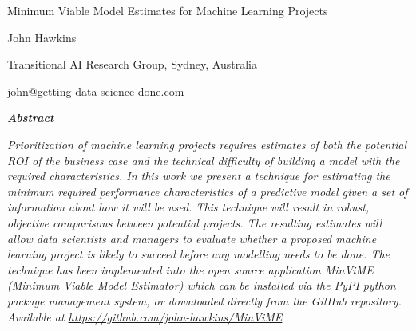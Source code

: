 \documentclass[11pt,a4paper]{article}
\begin{document}

\thispagestyle{firstPageStyle}

{ \vspace*{-0.05cm} \fontsize{21pt}{2em}\selectfont
  \centering Minimum Viable Model Estimates for Machine Learning Projects \par \vspace*{24pt minus \parskip} }
%
%
{ \centering  \fontsize{13pt}{1em}\selectfont John Hawkins \par\vspace*{12pt minus \parskip}}
%
{ \centering  \fontsize{13pt}{1em}\selectfont Transitional AI Research Group, Sydney, Australia\par \vspace*{18pt minus \parskip}}
{ \centering  \fontsize{10pt}{1em}\selectfont john@getting-data-science-done.com \par\vspace*{18pt minus \parskip} }

{ \fontsize{14pt}{1em}\selectfont \textbf{\textit{Abstract}} } \par \vspace*{6pt minus \parskip}

{  \fontsize{10pt}{1em}\selectfont
\textit{
Prioritization of machine learning projects requires estimates of both the potential ROI
of the business case and the technical difficulty of building a model with the required
characteristics.
In this work we present a technique for estimating the minimum required
performance characteristics of a predictive model given a set of information about
how it will be used. This technique will result in robust, objective comparisons between potential projects.
The resulting estimates will allow data scientists and managers
to evaluate whether a proposed machine learning project is likely to succeed
before any modelling needs to be done.
The technique has been implemented
into the open source application MinViME (Minimum Viable Model Estimator)
which can be installed via the PyPI python package management system, or downloaded directly from
the GitHub repository.
Available at \href{https://github.com/john-hawkins/MinViME}{https://github.com/john-hawkins/MinViME}
} \par \vspace*{6pt minus \parskip} }
 
\end{document}
